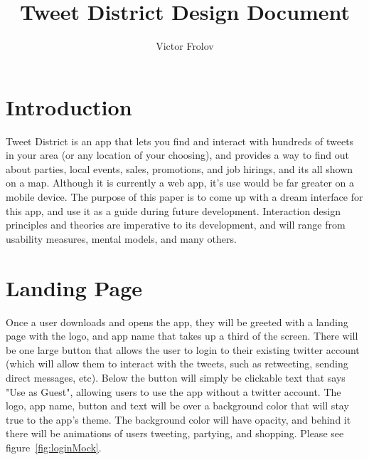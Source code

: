 \documentclass[11pt]{article}
\title{Tweet District Design Document}
\author{Victor Frolov}
\begin{document}
\maketitle

\section{Introduction}
Tweet District is an app that lets you find and interact with hundreds of tweets in your area (or any location of your choosing), and provides a way to find out about parties, local events, sales, promotions, and job hirings, and its all shown on a map. Although it is currently a web app, it's use would be far greater on a mobile device. The purpose of this paper is to come up with a dream interface for this app, and use it as a guide during future development. Interaction design principles and theories are imperative to its development, and will range from usability measures, mental models, and many others.


\section{Landing Page}
Once a user downloads and opens the app, they will be greeted with a landing page with the logo, and app name that takes up a third of the screen. There will be one large button that allows the user to login to their existing twitter account (which will allow them to interact with the tweets, such as retweeting, sending direct messages, etc). Below the button will simply be clickable text that says "Use as Guest", allowing users to use the app without a twitter account. The logo, app name, button and text will be over a background color that will stay true to the app's theme. The background color will have opacity, and behind it there will be animations of users tweeting, partying, and shopping. Please see figure~\ref{fig:loginMock}.
\end{document}
